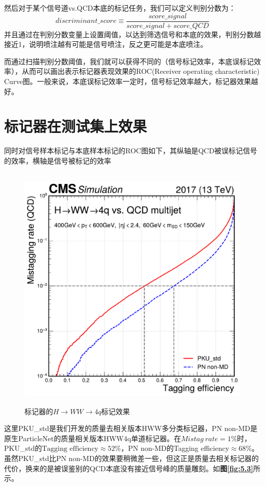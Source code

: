 然后对于某个信号道vs.QCD本底的标记任务，我们可以定义判别分数为：
\begin{equation}
    discriminant\_score\equiv\frac{score\_signal}{score\_signal + score\_QCD}
\end{equation}
并且通过在判别分数变量上设置阈值，以达到筛选信号和本底的效果，判别分数越接近1，说明喷注越有可能是信号喷注，反之更可能是本底喷注。

而通过扫描判别分数阈值，我们就可以获得不同的（信号标记效率，本底误标记效率），从而可以画出表示标记器表现效果的ROC(Receiver operating characteristic) Curve图。一般来说，本底误标记效率一定时，信号标记效率越大，标记器效果越好。
\section{标记器在测试集上效果}
同时对信号样本标记与本底样本标记的ROC图如下，其纵轴是QCD被误标记信号的效率，横轴是信号被标记的效率
\begin{figure}[H]\label{fig:5.2}
 \centering
 \caption{标记器的$H\to WW\to 4q$标记效果}
 \includegraphics[height=12cm, width=12cm]{pictures/ROC_HWW_4q.pdf}
\end{figure}
这里PKU\_std是我们开发的质量去相关版本HWW多分类标记器，PN non-MD是原生ParticleNet的质量相关版本HWW4q单道标记器。在$Mistag\ rate=1\%$时，PKU\_std的$\text{Tagging efficiency}\approx52\%$，PN non-MD的Tagging efficiency$\approx68\%$。虽然PKU\_std比PN non-MD的效果要稍微差一些，但这正是质量去相关标记器的代价，换来的是被误鉴别的QCD本底没有接近信号峰的质量雕刻。如\textbf{图\ref{fig:5.3}}所示。

